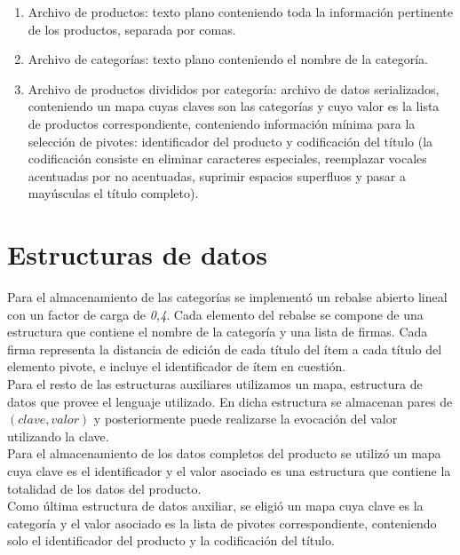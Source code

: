 \begin{enumerate}[1.]
\item  Archivo de productos: texto plano conteniendo toda la informaci\'on pertinente de los productos, separada por comas.
\item  Archivo de categor\'ias: texto plano conteniendo el nombre de la categor\'ia.
\item  Archivo de productos divididos por categor\'ia: archivo de datos serializados, conteniendo un mapa cuyas claves son las categor\'ias y cuyo valor es la lista de productos correspondiente, conteniendo informaci\'on m\'inima para la selecci\'on de pivotes: identificador del producto y codificaci\'on del t\'itulo (la codificaci\'on consiste en eliminar caracteres especiales, reemplazar vocales acentuadas por no acentuadas, suprimir espacios superfluos y pasar a may\'usculas el t\'itulo completo).
\end{enumerate}

\section{Estructuras de datos}

Para el almacenamiento de las categor\'ias se implement\'o un rebalse abierto lineal con un factor de carga de \textit{0,4}. Cada elemento del rebalse se compone de una estructura que contiene el nombre de la categor\'ia y una lista de firmas. Cada firma representa la distancia de edici\'on de cada t\'itulo del \'item a cada t\'itulo del elemento pivote, e incluye el identificador de \'item en cuesti\'on.\\

Para el resto de las estructuras auxiliares utilizamos un mapa, estructura de datos que provee el lenguaje utilizado. En dicha estructura se almacenan pares de $(clave,valor)$ y posteriormente puede realizarse la evocaci\'on del valor utilizando la clave.\\

Para el almacenamiento de los datos completos del producto se utiliz\'o un mapa cuya clave es el identificador y el valor asociado es una estructura que contiene la totalidad de los datos del producto.\\

Como \'ultima estructura de datos auxiliar, se eligi\'o un mapa cuya clave es la categor\'ia y el valor asociado es la lista de pivotes correspondiente, conteniendo solo el identificador del producto y la codificaci\'on del t\'itulo.\\



